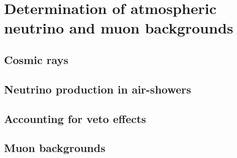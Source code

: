 \chapter{Determination of atmospheric neutrino and muon backgrounds\label{sec:backgrounds}}
\begingroup
\graphicspath{{results/HESE_Final_Paper/}}

\endgroup

\section{Cosmic rays}

\section{Neutrino production in air-showers}

\section{Accounting for veto effects}

\section{Muon backgrounds}
